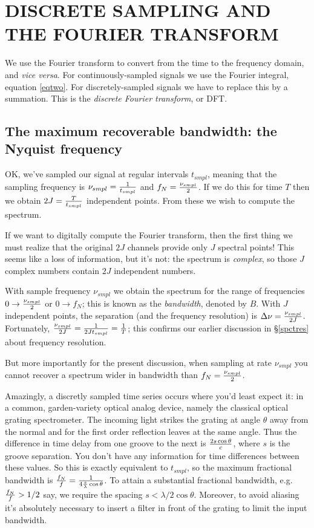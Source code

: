 \documentclass[11pt,preprint]{aastex}
\begin{document}
\section{DISCRETE SAMPLING AND THE FOURIER TRANSFORM}

          We use the Fourier transform to convert from the time to the
frequency domain, and {\it vice versa}.  For continuously-sampled
signals we use the Fourier integral, equation \ref{eqtwo}. For
discretely-sampled signals we have to replace this by a summation.  This
is the {\it discrete Fourier transform}, or DFT. 

\subsection {The maximum recoverable bandwidth: the Nyquist frequency}

         OK, we've sampled our signal at regular intervals $t_{smpl}$,
meaning that the sampling frequency is $\nu_{smpl} = {1 \over t_{smpl}}$
and $f_N = {\nu_{smpl} \over 2}$. If we do this for time $T$ then we
obtain $2J = {T \over t_{smpl}}$ independent points. From these we wish
to compute the spectrum.

	If we want to digitally compute the Fourier transform, then the
first thing we  must realize that the original $2J$ channels provide
only $J$ spectral points! This seems like a loss of information, but
it's not: the spectrum is {\it complex}, so those $J$ complex numbers
contain $2J$ independent numbers. 

	With sample frequency $\nu_{smpl}$ we obtain the spectrum for
the range of frequencies $0 \rightarrow {\nu_{smpl} \over 2}$ or $0
\rightarrow f_N$; this is known as the {\it bandwidth}, denoted by $B$.
With $J$ independent points, the separation (and the frequency
resolution) is $\Delta \nu = {\nu_{smpl} \over 2J}$. Fortunately,
${\nu_{smpl} \over 2J} = {1 \over 2 J t_{smpl}} = {1 \over T}$; this
confirms our earlier discussion in \S \ref{spctres} about frequency
resolution. 

	But more importantly for the present discussion, when sampling
at rate $\nu_{smpl}$ you cannot recover a spectrum wider in bandwidth
than $f_N = {\nu_{smpl} \over 2}$. 

	Amazingly, a discretly sampled time series occurs where you'd
least expect it: in a common, garden-variety optical analog device,
namely the classical optical grating spectrometer. The incoming light
strikes the grating at angle $\theta$ away from the normal and for the
first order reflection leaves at the same angle. Thus the difference in
time delay from one groove to the next is ${2s \cos \theta \over c}$,
where $s$ is the groove separation. You don't have any information for
time differences between these values. So this is exactly equivalent to
$t_{smpl}$, so the maximum fractional bandwidth is ${f_N \over f} = {1
\over 4 {s \over \lambda} \cos \theta}$. To attain a substantial
fractional bandwidth, e.g.\ ${f_N \over f} > {1/2}$ say, we require the
spacing $s < {\lambda /2 \cos \theta}$. Moreover, to avoid aliasing it's
absolutely necessary to insert a filter in front of the grating to limit
the input bandwidth. 
\end{document}
